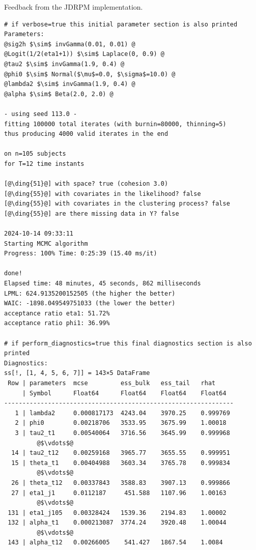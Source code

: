 \documentclass[12pt,	%
	a4paper,		%
	twoside,		%
	openright,		%
	titlepage,%
	]{book}
\theoremstyle{definition}
\newenvironment{code}{\captionsetup{type=listing}}{}
\begin{document}
\begin{code}
\caption[JDRPM interface feedback]{Feedback from the JDRPM implementation.}
    \begin{verbatim}
# if verbose=true this initial parameter section is also printed
Parameters:
@sig2h $\sim$ invGamma(0.01, 0.01) @
@Logit(1/2(eta1+1)) $\sim$ Laplace(0, 0.9) @
@tau2 $\sim$ invGamma(1.9, 0.4) @
@phi0 $\sim$ Normal($\mu$=0.0, $\sigma$=10.0) @
@lambda2 $\sim$ invGamma(1.9, 0.4) @
@alpha $\sim$ Beta(2.0, 2.0) @

- using seed 113.0 -
fitting 100000 total iterates (with burnin=80000, thinning=5)
thus producing 4000 valid iterates in the end

on n=105 subjects
for T=12 time instants

[@\ding{51}@] with space? true (cohesion 3.0)
[@\ding{55}@] with covariates in the likelihood? false
[@\ding{55}@] with covariates in the clustering process? false
[@\ding{55}@] are there missing data in Y? false

2024-10-14 09:33:11
Starting MCMC algorithm
Progress: 100% Time: 0:25:39 (15.40 ms/it)

done!
Elapsed time: 48 minutes, 45 seconds, 862 milliseconds
LPML: 624.9135200152505 (the higher the better)
WAIC: -1898.049549751033 (the lower the better)
acceptance ratio eta1: 51.72%
acceptance ratio phi1: 36.99%

# if perform_diagnostics=true this final diagnostics section is also printed 
Diagnostics:
ss[!, [1, 4, 5, 6, 7]] = 143×5 DataFrame
 Row | parameters  mcse         ess_bulk   ess_tail   rhat
     | Symbol      Float64      Float64    Float64    Float64
---------------------------------------------------------------
   1 | lambda2     0.000817173  4243.04    3970.25    0.999769
   2 | phi0        0.00218706   3533.95    3675.99    1.00018
   3 | tau2_t1     0.00540064   3716.56    3645.99    0.999968
         @$\vdots$@
  14 | tau2_t12    0.00259168   3965.77    3655.55    0.999951
  15 | theta_t1    0.00404988   3603.34    3765.78    0.999834
         @$\vdots$@
  26 | theta_t12   0.00337843   3588.83    3907.13    0.999866  
  27 | eta1_j1     0.0112187     451.588   1107.96    1.00163
         @$\vdots$@
 131 | eta1_j105   0.00328424   1539.36    2194.83    1.00002
 132 | alpha_t1    0.000213087  3774.24    3920.48    1.00044
         @$\vdots$@
 143 | alpha_t12   0.00266005    541.427   1867.54    1.0084

\end{verbatim}
\end{code}
\end{document}
